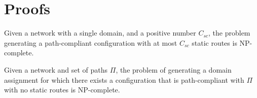 \section{Proofs}
\begin{theorem}
\label{thm:ospfsynth}
Given a
network with a single domain,
and a positive number $C_{sc}$,
the problem generating
a path-compliant configuration with at most $C_{sc}$ static routes
is NP-complete.
\end{theorem}


\begin{theorem}
	Given a
	network and  set of paths  $\Pi$,
	the problem of generating a domain assignment for which
	there exists a 
	configuration that is path-compliant with $\Pi$ with no static routes
	is NP-complete.
\end{theorem}

